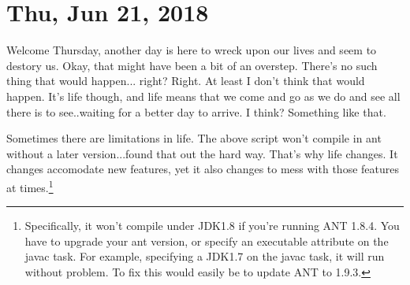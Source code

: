 \section{Thu, Jun 21, 2018}

Welcome Thursday, another day is here to wreck upon our lives and seem to
destory us. Okay, that might have been a bit of an overstep. There's no such
thing that would happen... right? Right. At least I don't think that would
happen. It's life though, and life means that we come and go as we do and see
all there is to see..waiting for a better day to arrive. I think? Something like
that.



Sometimes there are limitations in life. The above script won't compile in ant
without a later version...found that out the hard way. That's why life changes.
It changes accomodate new features, yet it also changes to mess with those
features at times.\footnote{
Specifically, it won't compile under JDK1.8 if you're running ANT 1.8.4. You
have to upgrade your ant version, or specify an executable attribute on the
javac task. For example, specifying a JDK1.7 on the javac task, it will run
without problem. To fix this would easily be to update ANT to 1.9.3.
}
